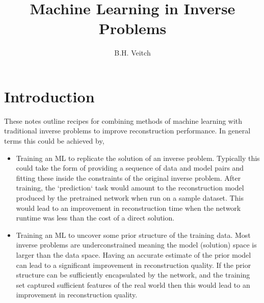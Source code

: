 \documentclass[12pt]{article}
\begin{document}
\title{Machine Learning in Inverse Problems}
\author{B.H. Veitch}
\maketitle
\section{Introduction}
These notes outline recipes for combining methods of machine learning with traditional inverse problems to improve reconstruction performance. In general terms this could be achieved by,
\begin{itemize}
\item Training an ML to replicate the solution of an inverse problem. Typically this could take the form of providing a sequence of data and model pairs and fitting these inside the constraints of the original inverse problem. After training, the `prediction` task would amount to the reconstruction model produced by the pretrained network when run on a sample dataset. This would lead to an improvement in reconstruction time when the network runtime was less than the cost of a direct solution. 
\item Training an ML to uncover some prior structure of the training data. Most inverse problems are underconstrained meaning the model (solution) space is larger than the data space. Having an accurate estimate of the prior model can lead to a significant improvement in reconstruction quality. If the prior structure can be sufficiently encapsulated by the network, and the training set captured sufficient features of the real world then this would lead to an improvement in reconstruction quality. 
\end{itemize}
\end{document}
